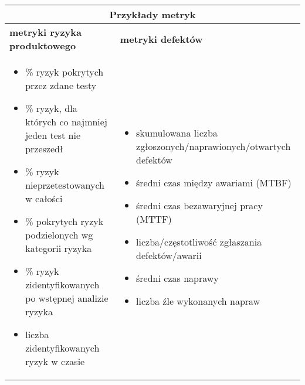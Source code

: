 \documentclass[../main.tex]{subfiles}
\begin{document}
    \begin{table}[H]
        \begin{center}
            \begin{tabular}{| p{8cm} | p{8cm} |}
                \hline
                \multicolumn{2}{|c|}{\textbf{Przykłady metryk}}\\
                \hline
                \hline
                \textbf{metryki ryzyka produktowego} & \textbf{metryki defektów}\\
                \hline
                \begin{itemize}
                    \item \% ryzyk pokrytych przez zdane testy
                    \item \% ryzyk, dla których co najmniej jeden test nie przeszedł
                    \item \% ryzyk nieprzetestowanych w całości
                    \item \% pokrytych ryzyk podzielonych wg kategorii ryzyka
                    \item \% ryzyk zidentyfikowanych po wstępnej analizie ryzyka
                    \item liczba zidentyfikowanych ryzyk w czasie
                \end{itemize}
                &
                \begin{itemize}
                    \item skumulowana liczba zgłoszonych/naprawionych/otwartych defektów
                    \item średni czas między awariami (MTBF)
                    \item średni czas bezawaryjnej pracy (MTTF)
                    \item liczba/częstotliwość zgłaszania defektów/awarii
                    \item średni czas naprawy
                    \item liczba źle wykonanych napraw
                \end{itemize}\\
                \hline
            \end{tabular}
        \end{center}
    \end{table}
\end{document}
